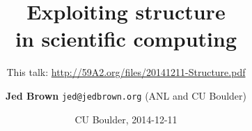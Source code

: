 \documentclass{beamer}
\title{Exploiting structure \\ in scientific computing}
\subtitle{This talk: \url{http://59A2.org/files/20141211-Structure.pdf}}
\author{{\bf Jed Brown} \texttt{jed@jedbrown.org} (ANL and CU Boulder)}
\date{CU Boulder, 2014-12-11}
\begin{document}
\lstset{language=C}
\normalem

\begin{frame}
  \titlepage
\end{frame}




\end{document}
